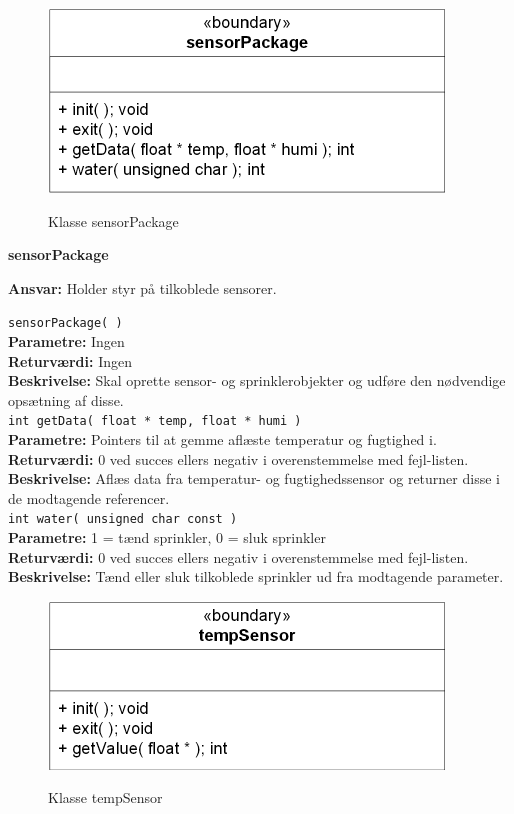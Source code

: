 
\begin{figure}[htbp] \centering
{\includegraphics[scale=1.3]{filer/design/Klassediagrammer/sw_psoc_sensorPackage}}
\caption{Klasse sensorPackage}
\label{fig:sw_psoc_class_sensorPackage}
\end{figure} 

{\centering
\textbf{sensorPackage}\par
}
\textbf{Ansvar:} Holder styr på tilkoblede sensorer. \

\verb+sensorPackage( ) +\\
\textbf{Parametre:} Ingen \\
\textbf{Returværdi:} Ingen \\
\textbf{Beskrivelse:} Skal oprette sensor- og sprinklerobjekter og udføre den nødvendige opsætning af disse. \\

\verb+int getData( float * temp, float * humi )+ \\
\textbf{Parametre:} Pointers til at gemme aflæste temperatur og fugtighed i. \\
\textbf{Returværdi:} 0 ved succes ellers negativ i overenstemmelse med fejl-listen. \\
\textbf{Beskrivelse:} Aflæs data fra temperatur- og fugtighedssensor og returner disse i de modtagende referencer. \\

\verb+int water( unsigned char const )+ \\
\textbf{Parametre:} 1 = tænd sprinkler, 0 = sluk sprinkler \\
\textbf{Returværdi:} 0 ved succes ellers negativ i overenstemmelse med fejl-listen. \\
\textbf{Beskrivelse:} Tænd eller sluk tilkoblede sprinkler ud fra modtagende parameter. \\


\begin{figure}[htbp] \centering
{\includegraphics[scale=1.3]{filer/design/Klassediagrammer/sw_psoc_tempSensor}}
\caption{Klasse tempSensor}
\label{fig:sw_psoc_class_tempSensor}
\end{figure} 

